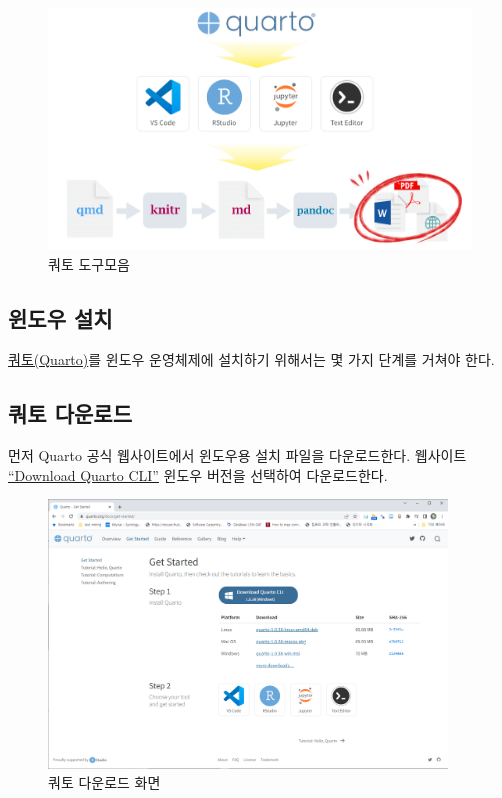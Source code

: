 \documentclass[
  letterpaper,
]{book}
\begin{document}
\begin{figure}

{\centering \includegraphics{images/quarto-toolchain.png}

}

\caption{쿼토 도구모음}

\end{figure}

\hypertarget{uxc708uxb3c4uxc6b0-uxc124uxce58}{%
\subsection{윈도우 설치}\label{uxc708uxb3c4uxc6b0-uxc124uxce58}}

\href{https://quarto.org/}{쿼토(Quarto)}를 윈도우 운영체제에 설치하기
위해서는 몇 가지 단계를 거쳐야 한다.

\hypertarget{uxcffcuxd1a0-uxb2e4uxc6b4uxb85cuxb4dc}{%
\subsection{쿼토 다운로드}\label{uxcffcuxd1a0-uxb2e4uxc6b4uxb85cuxb4dc}}

먼저 Quarto 공식 웹사이트에서 윈도우용 설치 파일을 다운로드한다.
웹사이트 \href{https://quarto.org/docs/get-started/}{``Download Quarto
CLI''} 윈도우 버전을 선택하여 다운로드한다.

\begin{figure}

{\centering \includegraphics[width=4.16667in,height=\textheight]{images/quarto-download.png}

}

\caption{쿼토 다운로드 화면}

\end{figure}
\end{document}
